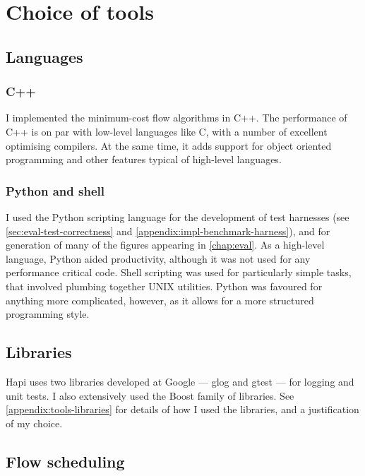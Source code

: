 \section{Choice of tools}

\subsection{Languages} 

\subsubsection{C++}
I implemented the minimum-cost flow algorithms in C++. The performance of C++ is on par with low-level languages like C, with a number of excellent optimising compilers\footnotemark. At the same time, it adds support for object oriented programming and other features typical of high-level languages.

\subsubsection{Python and shell}
I used the Python scripting language for the development of test harnesses (see \cref{sec:eval-test-correctness} and \cref{appendix:impl-benchmark-harness}), and for generation of many of the figures appearing in \cref{chap:eval}. As a high-level language, Python aided productivity, although it was not used for any performance critical code. Shell scripting was used for particularly simple tasks, that involved plumbing together UNIX utilities. Python was favoured for anything more complicated, however, as it allows for a more structured programming style.

\subsection{Libraries} \label{sec:prep-tools-libraries}

Hapi uses two libraries developed at Google --- glog and gtest --- for logging and unit tests. I also extensively used the Boost family of libraries. See \cref{appendix:tools-libraries} for details of how I used the libraries, and a justification of my choice. 

\subsection{Flow scheduling}

